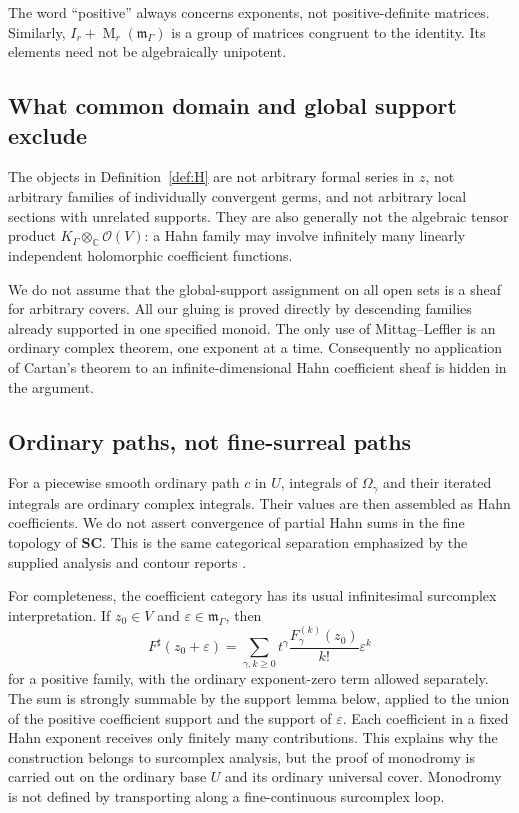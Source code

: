 \documentclass[11pt,letterpaper]{article}
\numberwithin{equation}{section}
\theoremstyle{definition}
\theoremstyle{remark}
\newcommand{\C}{\mathbb C}
\newcommand{\SC}{\mathbf{SC}}
\newcommand{\OO}{\mathcal O}
\newcommand{\mm}{\mathfrak m}
\newcommand{\Mat}{\operatorname{M}}
\newcommand{\K}{K_\Gamma}
\begin{document}
The word ``positive'' always concerns exponents, not positive-definite
matrices. Similarly, $I_r+\Mat_r(\mm_\Gamma)$ is a group of matrices
congruent to the identity. Its elements need not be algebraically unipotent.

\subsection{What common domain and global support exclude}
The objects in Definition~\ref{def:H} are not arbitrary formal series in $z$,
not arbitrary families of individually convergent germs, and not arbitrary
local sections with unrelated supports. They are also generally not the
algebraic tensor product $\K\otimes_\C\OO(V)$: a Hahn family may involve
infinitely many linearly independent holomorphic coefficient functions.

We do not assume that the global-support assignment on all open sets is a
sheaf for arbitrary covers. All our gluing is proved directly by descending
families already supported in one specified monoid. The only use of
Mittag--Leffler is an ordinary complex theorem, one exponent at a time.
Consequently no application of Cartan's theorem to an infinite-dimensional
Hahn coefficient sheaf is hidden in the argument.

\subsection{Ordinary paths, not fine-surreal paths}
For a piecewise smooth ordinary path $c$ in $U$, integrals of
$\Omega_\gamma$ and their iterated integrals are ordinary complex integrals.
Their values are then assembled as Hahn coefficients. We do not assert
convergence of partial Hahn sums in the fine topology of $\SC$. This is the
same categorical separation emphasized by the supplied analysis and contour
reports \cite{repo-analysis,repo-contours}.

For completeness, the coefficient category has its usual infinitesimal
surcomplex interpretation. If $z_0\in V$ and
$\varepsilon\in\mm_\Gamma$, then
\begin{equation}\label{eq:halo-eval}
 F^\sharp(z_0+\varepsilon)=
 \sum_{\gamma,k\geq0}
 t^\gamma\frac{F_\gamma^{(k)}(z_0)}{k!}\varepsilon^k
\end{equation}
for a positive family, with the ordinary exponent-zero term allowed
separately. The sum is strongly summable by the support lemma below, applied
to the union of the positive coefficient support and the support of
$\varepsilon$. Each coefficient in a fixed Hahn exponent receives only
finitely many contributions. This explains why the construction belongs to
surcomplex analysis, but the proof of monodromy is carried out on the
ordinary base $U$ and its ordinary universal cover. Monodromy is not defined
by transporting along a fine-continuous surcomplex loop.
\end{document}
